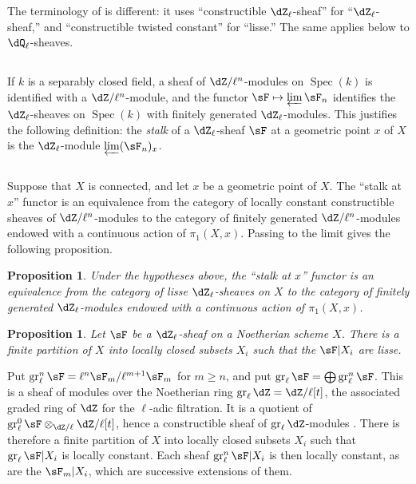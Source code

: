 \documentclass[12pt,oneside,english]{smfbook}
\DeclareMathOperator{\gr}{gr}
\DeclareMathOperator{\spec}{Spec}
\newtheorem{proposition_}[subsection]{Proposition}
\begin{document}
The terminology of \cite{sga5} is different: it uses ``constructible $\dZ_\ell$-sheaf'' for ``$\dZ_\ell$-sheaf,'' and ``constructible twisted constant'' for ``lisse.'' The same applies below to $\dQ_\ell$-sheaves.

\subsection{}\label{II:2-2}

If $k$ is a separably closed field, a sheaf of $\dZ/\ell^n$-modules on $\spec(k)$ is identified with a $\dZ/\ell^n$-module, and the functor $\sF\mapsto\varprojlim\sF_n$ identifies the $\dZ_\ell$-sheaves on $\spec(k)$ with finitely generated $\dZ_\ell$-modules. This justifies the following definition: the \emph{stalk} of a $\dZ_\ell$-sheaf $\sF$ at a geometric point $x$ of $X$ is the $\dZ_\ell$-module $\varprojlim(\sF_n)_x$.

\subsection{}\label{II:2-3}

Suppose that $X$ is connected, and let $x$ be a geometric point of $X$. The ``stalk at $x$'' functor is an equivalence from the category of locally constant constructible sheaves of $\dZ/\ell^n$-modules to the category of finitely generated $\dZ/\ell^n$-modules endowed with a continuous action of $\pi_1(X,x)$. Passing to the limit gives the following proposition.

\begin{proposition_}\label{II:2-4}
Under the hypotheses above, the ``stalk at $x$'' functor is an equivalence from the category of lisse $\dZ_\ell$-sheaves on $X$ to the category of finitely generated $\dZ_\ell$-modules endowed with a continuous action of $\pi_1(X,x)$.
\end{proposition_}

\begin{proposition_}\label{II:2-5}
Let $\sF$ be a $\dZ_\ell$-sheaf on a Noetherian scheme $X$. There is a finite partition of $X$ into locally closed subsets $X_i$ such that the $\sF|X_i$ are lisse.
\end{proposition_}

Put $\gr_\ell^n\sF=\ell^n\sF_m/\ell^{m+1}\sF_m$ for $m\geqslant n$, and put $\gr_\ell\sF=\bigoplus\gr_\ell^n\sF$. This is a sheaf of modules over the Noetherian ring $\gr_\ell\dZ=\dZ/\ell[t]$, the associated graded ring of $\dZ$ for the $\ell$-adic filtration. It is a quotient of $\gr_\ell^0\sF\otimes_{\dZ/\ell}\dZ/\ell[t]$, hence a constructible sheaf of $\gr_\ell\dZ$-modules \cite[IX.2]{sga4}. There is therefore a finite partition of $X$ into locally closed subsets $X_i$ such that $\gr_\ell\sF|X_i$ is locally constant. Each sheaf $\gr_\ell^n\sF|X_i$ is then locally constant, as are the $\sF_m|X_i$, which are successive extensions of them.
\end{document}
